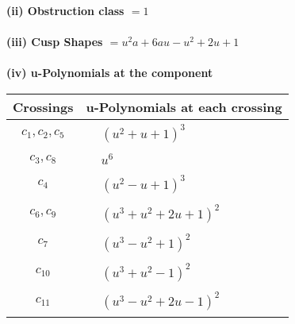 \documentclass[1p]{elsarticle_modified}
\theoremstyle{definition}
\begin{document}
\flushleft \textbf{(ii) Obstruction class $= 1$}\\~\\
\flushleft \textbf{(iii) Cusp Shapes $= u^2 a+6 a u- u^2+2 u+1$}\\~\\
\newpage\renewcommand{\arraystretch}{1}
\flushleft \textbf{(iv) u-Polynomials at the component}\newline \\
\begin{tabular}{m{50pt}|m{274pt}}
Crossings & \hspace{64pt}u-Polynomials at each crossing \\
\hline $$\begin{aligned}c_{1},c_{2},c_{5}\end{aligned}$$&$\begin{aligned}
&(u^2+u+1)^3
\end{aligned}$\\
\hline $$\begin{aligned}c_{3},c_{8}\end{aligned}$$&$\begin{aligned}
&u^6
\end{aligned}$\\
\hline $$\begin{aligned}c_{4}\end{aligned}$$&$\begin{aligned}
&(u^2- u+1)^3
\end{aligned}$\\
\hline $$\begin{aligned}c_{6},c_{9}\end{aligned}$$&$\begin{aligned}
&(u^3+u^2+2 u+1)^2
\end{aligned}$\\
\hline $$\begin{aligned}c_{7}\end{aligned}$$&$\begin{aligned}
&(u^3- u^2+1)^2
\end{aligned}$\\
\hline $$\begin{aligned}c_{10}\end{aligned}$$&$\begin{aligned}
&(u^3+u^2-1)^2
\end{aligned}$\\
\hline $$\begin{aligned}c_{11}\end{aligned}$$&$\begin{aligned}
&(u^3- u^2+2 u-1)^2
\end{aligned}$\\
\hline
\end{tabular}\\~\\
\end{document}
